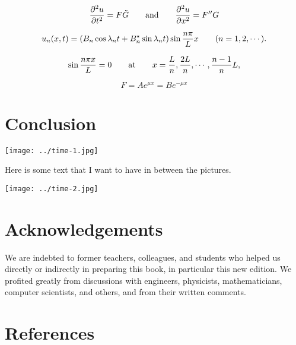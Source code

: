 \documentclass[12pt, a4paper, reqno]{amsart}
\begin{document}
\begin{equation}
    \frac{ \partial^2{u} }{ \partial{t^2} } = F\ddot{G} \qquad \text{and} \\
    \qquad \frac{ \partial^2{u} }{ \partial{x^2} } = F''G
\end{equation}

\begin{equation}
    u_n(x,t)=(B_n\cos{\lambda_n t} + B_n^\star\sin{\lambda_n t}) \\
    \sin{\frac{n\pi}{L} x} \quad \quad (n=1,2,\dotsb).
\end{equation}

\begin{equation}                                                                
    \sin{\frac{n\pi x}{L}}=0 \qquad \text{at} \\                             
    \qquad x=\frac{L}{n}, \frac{2L}{n},\dotsb,\frac{n-1}{n}L,                      
\end{equation}  

\begin{equation}                                                                
    F=Ae^{\mu x} = Be^{-\mu x}                                                  
\end{equation}   

\section{Conclusion}

\begin{center}
\texttt{[image: ../time-1.jpg]}

Here is some text that I want to have in between the pictures.

\texttt{[image: ../time-2.jpg]}
\end{center}

\section{Acknowledgements}

We are indebted to former teachers, colleagues, and students who helped us 
directly or indirectly in preparing this book, in particular this new edition. 
We profited greatly from discussions with engineers, physicists, 
mathematicians, computer scientists, and others, and from their written 
comments.

\section{References}
\end{document}
